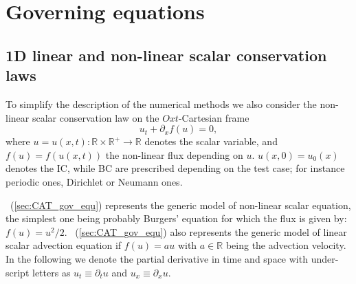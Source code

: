%
\section{Governing equations} \label{sec:equations}

\subsection{1D linear and non-linear scalar conservation laws}
To simplify the description of the numerical methods we also consider the non-linear scalar conservation law on the $Oxt$-Cartesian frame
\begin{equation}
    \label{sec:CAT_gov_equ}
    u_t + \partial_x f(u) = 0,
\end{equation} 
where $u=u(x,t):\mathbb{R}\times\mathbb{R}^+\rightarrow\mathbb{R}$ denotes the scalar variable, and $f(u)=f(u(x,t))$ the non-linear flux depending on $u$.
$u(x,0)=u_0(x)$ denotes the IC, while BC are prescribed depending on the test case; for instance periodic ones, Dirichlet or Neumann ones. 

~(\ref{sec:CAT_gov_equ}) represents the generic model of non-linear scalar equation, the simplest one being probably Burgers' equation for which the flux is given by: $f(u)=u^2/2$.
~(\ref{sec:CAT_gov_equ}) also represents the generic model of linear scalar advection equation if $f(u)=a u$ with $a\in \mathbb{R}$ being the advection velocity. \\ 
In the following we denote the partial derivative in time and space with under-script letters as 
$u_t \equiv \partial_t u$ and $u_x \equiv \partial_x u$.

